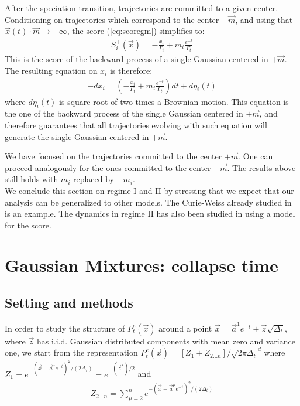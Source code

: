 \documentclass[10pt,twocolumn]{article}
\newcommand{\vx}{\vec x}
\newcommand{\va}{\vec a}
\begin{document}
After the speciation transition, trajectories are committed to a given center. Conditioning on trajectories which correspond to the center $+\vec m$, and using that $\vec{x}(t)\cdot \vec{m} \rightarrow +\infty$, the score (\ref{eq:scoregm}) simplifies to:  
\begin{align}
   S_i^+(\vx) = -\frac{x_i}{\Gamma_t}+m_i \frac{e^{-t}}{\Gamma_t}
\end{align}
This is the score of the backward process of a single Gaussian centered in $+\vec m$. The resulting equation on $x_i$ is therefore: 
\begin{align}\label{eq:regimeiigm}
-dx_i=\left(-\frac{x_i}{\Gamma_t}+m_i \frac{e^{-t}}{\Gamma_t}\right)dt +d\eta_i(t)
\end{align}
where $d\eta_i(t)$ is square root of two times a Brownian motion. This equation is the one of the backward process of the single Gaussian centered in $+\vec m$, and therefore guarantees that all trajectories evolving with such equation will generate the single Gaussian centered in $+\vec m$. 

We have focused on the trajectories committed to the center $+\vec m$. One can proceed analogously for the ones committed to the center $-\vec m$. The results above still holds with $m_i$ replaced by $-m_i$.
\\
We conclude this section on regime I and II by stressing that we expect that our analysis can be generalized to other models. The Curie-Weiss already studied in \cite{GBM} is an example. The dynamics in regime II has also been studied in \cite{ghio2023sampling} using a model for the score. 


\section{Gaussian Mixtures: collapse time} \label{sect_collapseGM}

\subsection{Setting and methods} 
In order to study the structure of $ P_t^e(\vx)$ around a point $\vx=\va^1e^{-t}+\vec z\sqrt{\Delta_t}$, where $\vec z$ has i.i.d. Gaussian distributed components with mean zero and variance one,  we start from the representation $P_t^e(\vx)= \left[Z_1+Z_{2...n}\right]/\sqrt{2\pi
  \Delta_t}^d$
  where $Z_1= e^{-(\vx-\va^1 e^{-t})^2/(2\Delta_t)}= e^{-(\vec z^2)/2}  $
and
\begin{align}
Z_{2...n}= \sum_{\mu=2}^n e^{-(\vx-\va^\mu e^{-t})^2/(2\Delta_t)} 
\end{align}
\end{document}
